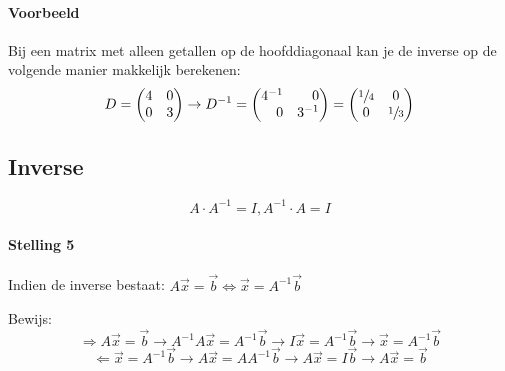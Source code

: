\paragraph{Voorbeeld} Bij een matrix met alleen getallen op de hoofddiagonaal kan je de inverse op de volgende manier makkelijk berekenen:
\[ D = \begin{pmatrix} 4 & 0 \\ 0 & 3 \end{pmatrix} \to D^{-1} = \begin{pmatrix*}[r] 4^{-1} & 0 \\ 0 & 3^{-1} \end{pmatrix*} = \begin{pmatrix} \sfrac{1}{4} & 0 \\ 0 & \sfrac{1}{3} \end{pmatrix} \]

\subsection{Inverse}
\[ A \cdot A^{-1} = I, A^{-1} \cdot A = I \]
\paragraph{Stelling 5}  Indien de inverse bestaat: $A \vec{x} = \vec{b} \Leftrightarrow \vec{x} = A^{-1} \vec{b}$

Bewijs:
\[ \Rightarrow A \vec{x} = \vec{b} \to A^{-1}A \vec{x} = A^{-1} \vec{b} \to I \vec{x} = A^{-1} \vec{b} \to \vec{x} = A^{-1} \vec{b} \]
\[ \Leftarrow \vec{x} = A^{-1} \vec{b} \to A \vec{x} = AA^{-1} \vec{b} \to A \vec{x} = I \vec{b} \to A \vec{x} = \vec{b} \]

